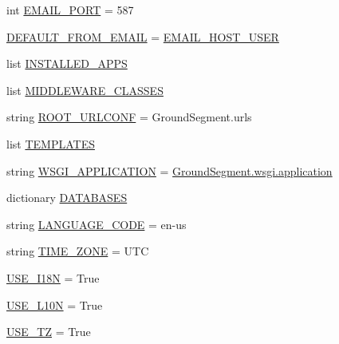 \begin{DoxyCompactItemize}
\item 
int \hyperlink{namespace_ground_segment_1_1settings_af36bc449cf8894642e0ceabe6b668810}{E\+M\+A\+I\+L\+\_\+\+P\+O\+R\+T} = 587
\item 
\hyperlink{namespace_ground_segment_1_1settings_ac016a8ca7717627c7aa8538920482b88}{D\+E\+F\+A\+U\+L\+T\+\_\+\+F\+R\+O\+M\+\_\+\+E\+M\+A\+I\+L} = \hyperlink{namespace_ground_segment_1_1settings_a0bc4395f3eefc35a5ad7741002256650}{E\+M\+A\+I\+L\+\_\+\+H\+O\+S\+T\+\_\+\+U\+S\+E\+R}
\item 
list \hyperlink{namespace_ground_segment_1_1settings_a87e988a27e0909411e0d3111b409f128}{I\+N\+S\+T\+A\+L\+L\+E\+D\+\_\+\+A\+P\+P\+S}
\item 
list \hyperlink{namespace_ground_segment_1_1settings_abd392b70ea7895ec177a28651e7616c8}{M\+I\+D\+D\+L\+E\+W\+A\+R\+E\+\_\+\+C\+L\+A\+S\+S\+E\+S}
\item 
string \hyperlink{namespace_ground_segment_1_1settings_af881d9abde1eaf859b6067764a32059a}{R\+O\+O\+T\+\_\+\+U\+R\+L\+C\+O\+N\+F} = \textquotesingle{}Ground\+Segment.\+urls\textquotesingle{}
\item 
list \hyperlink{namespace_ground_segment_1_1settings_aef52073a71704189e79714d515ba3de3}{T\+E\+M\+P\+L\+A\+T\+E\+S}
\item 
string \hyperlink{namespace_ground_segment_1_1settings_a5ae8b98baa409aa4ea87856e4114a64e}{W\+S\+G\+I\+\_\+\+A\+P\+P\+L\+I\+C\+A\+T\+I\+O\+N} = \textquotesingle{}\hyperlink{namespace_ground_segment_1_1wsgi_aeb034272175cec355b04712ebf413192}{Ground\+Segment.\+wsgi.\+application}\textquotesingle{}
\item 
dictionary \hyperlink{namespace_ground_segment_1_1settings_a73f9e9739e7dccd65add635931f4f98e}{D\+A\+T\+A\+B\+A\+S\+E\+S}
\item 
string \hyperlink{namespace_ground_segment_1_1settings_ad00a75a321dcbd00ef2dc2d0181ea4bb}{L\+A\+N\+G\+U\+A\+G\+E\+\_\+\+C\+O\+D\+E} = \textquotesingle{}en-\/us\textquotesingle{}
\item 
string \hyperlink{namespace_ground_segment_1_1settings_a7f5b157199222270cc12a900b1dbb6cc}{T\+I\+M\+E\+\_\+\+Z\+O\+N\+E} = \textquotesingle{}U\+T\+C\textquotesingle{}
\item 
\hyperlink{namespace_ground_segment_1_1settings_a58a4a6948688cc8ccf2f31d6bea3a954}{U\+S\+E\+\_\+\+I18\+N} = True
\item 
\hyperlink{namespace_ground_segment_1_1settings_a8cf0ce46819ba284c86a1e87267378af}{U\+S\+E\+\_\+\+L10\+N} = True
\item 
\hyperlink{namespace_ground_segment_1_1settings_a1d9e63721f37542ce41c8145755c7d7e}{U\+S\+E\+\_\+\+T\+Z} = True

\end{DoxyCompactItemize}

